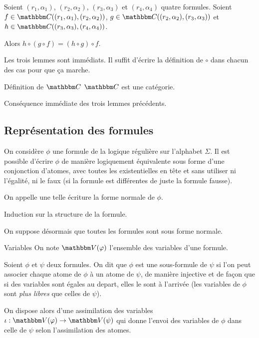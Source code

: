 \begin{lem}
    Soient $(r_1,\alpha_1)$, $(r_2,\alpha_2)$, $(r_3,\alpha_3)$ et $(r_4,\alpha_4)$
    quatre formules.
    Soient $f\in\C((r_1,\alpha_1), (r_2,\alpha_2))$,
    $g\in\C((r_2,\alpha_2), (r_3,\alpha_3))$ et $h\in\C((r_3,\alpha_3),(r_4,\alpha_4))$.

    Alors $h\circ(g\circ f) = (h\circ g)\circ f$.
\end{lem}

\begin{pv} Les trois lemmes sont immédiats. Il suffit d'écrire la définition de $\circ$
    dans chacun des cas pour que ça marche.
\end{pv}

\begin{theo}{Définition de $\C$}
    $\C$ est une catégorie.
\end{theo}

\begin{pv} Conséquence immédiate des trois lemmes précédents.
\end{pv}

\subsection{Représentation des formules}

\begin{lem}
    On considère $\phi$ une formule de la logique régulière sur l'alphabet
    $\Sigma$.  Il est possible d'écrire $\phi$ de manière logiquement
    équivalente sous forme d'une conjonction d'atomes, avec toutes les
    existentielles en tête et sans utiliser ni l'égalité, ni le faux (si la
    formule est différentes de juste la formule fausse).

    On appelle une telle écriture la forme normale de $\phi$.
\end{lem}

\begin{pv} Induction sur la structure de la formule.
\end{pv}

On suppose désormais que toutes les formules sont sous forme normale.

\begin{defi}{Variables}
    On note $\V(\phi)$ l'ensemble des variables d'une formule.
\end{defi}

\begin{rem}
    Soient $\phi$ et $\psi$ deux formules. On dit que $\phi$ est une sous-formule
    de $\psi$ si l'on peut associer chaque atome de $\phi$ à un atome de $\psi$, de
    manière injective et de façon que si des variables sont égales au depart, elles
    le sont à l'arrivée (les variables de $\phi$ sont \emph{plus libres} que celles
    de $\psi$).

    On dispose alors d'une assimilation des variables
    $\iota : \V(\phi)\rightarrow \V(\psi)$ qui donne l'envoi des variables de $\phi$
    dans celle de $\psi$ selon l'assimilation des atomes.
\end{rem}

